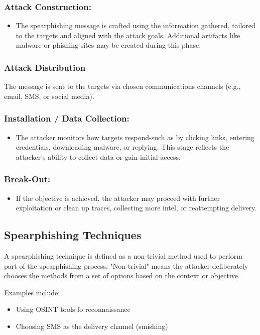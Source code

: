 \subsubsection{Attack Construction:}
\begin{itemize}
    \item The spearphishing message is crafted using the information gathered, tailored to the targets and aligned with the attack goals. Additional artifacts like malware or phishing sites may be created during this phase.
\end{itemize}
\subsubsection{Attack Distribution}
The message is sent to the targets via chosen communications channels (e.g., email, SMS, or social media).
\subsubsection{Installation / Data Collection:}
\begin{itemize}
    \item The attacker monitors how targets respond-such as by clicking links, entering credentials, downloading malware, or replying. This stage reflects the attacker's ability to collect data or gain initial access.
\end{itemize}
\subsubsection{Break-Out:}
\begin{itemize}
    \item If the objective is achieved, the attacker may proceed with further exploitation or clean up traces, collecting more intel, or reattempting delivery.
\end{itemize}

\subsection{Spearphishing Techniques}
A spearphishing technique is defined as a non-trivial method used to perform part of the spearphishing process. "Non-trivial" means the attacker deliberately chooses the methods from a set of options based on the context or objective.

Examples include:
\begin{itemize}
    \item Using OSINT tools fo reconnaissance
    \item Choosing SMS as the delivery channel (smishing)
\end{itemize}

